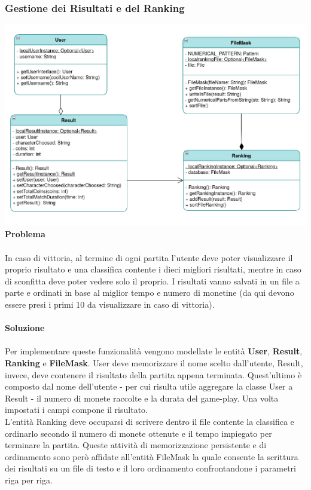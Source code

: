 \documentclass[12pt, letterpaper]{article}
\begin{document}
        \subsubsection{Gestione dei Risultati e del Ranking}
            \includegraphics[width=\textwidth]{result-ranking.png}
            \textbf{Problema} 
            \\ \\
            In caso di vittoria, al termine di ogni partita l'utente deve poter visualizzare il proprio risultato e una classifica contente i dieci migliori risultati, mentre in caso di sconfitta deve poter vedere solo il proprio.
            I risultati vanno salvati in un file a parte e ordinati in base al miglior tempo e numero di monetine (da qui devono essere presi i primi 10 da visualizzare in caso di vittoria).
            \\ \\
            \textbf{Soluzione} 
            \\ \\
            Per implementare queste funzionalità vengono modellate le entità \textbf{User}, \textbf{Result}, \textbf{Ranking} e \textbf{FileMask}. User deve memorizzare il nome scelto dall'utente, Result, invece, deve contenere il risultato della partita appena terminata. Quest'ultimo è composto dal nome dell'utente - per cui risulta utile aggregare la classe User a Result - il numero di monete raccolte e la durata del game-play. Una volta impostati i campi compone il risultato. 
            \\
            L'entità Ranking deve occuparsi di scrivere dentro il file contente la classifica e ordinarlo secondo il numero di monete ottenute e il tempo impiegato per terminare la partita. Queste attività di memorizzazione persistente e di ordinamento sono però affidate all'entità FileMask la quale consente la scrittura dei risultati su un file di testo e il loro ordinamento confrontandone i parametri riga per riga.
\end{document}
